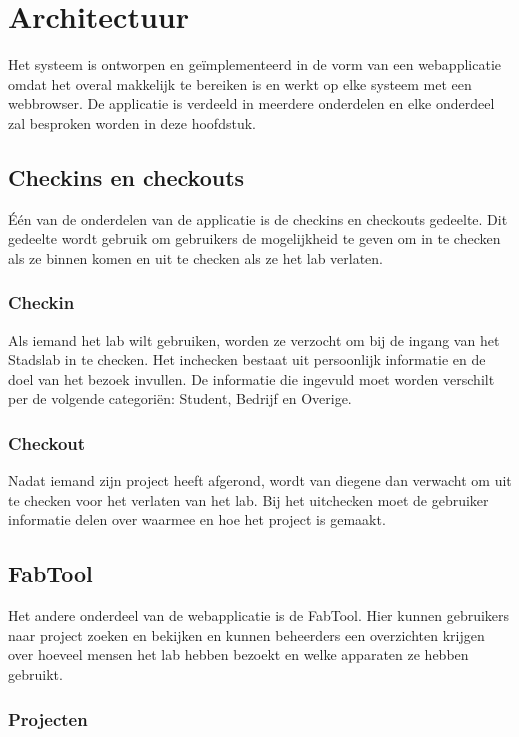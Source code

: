 \chapter{Architectuur}

Het systeem is ontworpen en ge\"implementeerd in de vorm van een webapplicatie omdat het overal makkelijk te bereiken is en werkt op elke systeem met een webbrowser. De applicatie is verdeeld in meerdere onderdelen en elke onderdeel zal besproken worden in deze hoofdstuk.

\section{Checkins en checkouts}

\'E\'en van de onderdelen van de applicatie is de checkins en checkouts gedeelte. Dit gedeelte wordt gebruik om gebruikers de mogelijkheid te geven om in te checken als ze binnen komen en uit te checken als ze het lab verlaten.

\subsection{Checkin}

Als iemand het lab wilt gebruiken, worden ze verzocht om bij de ingang van het Stadslab in te checken. Het inchecken bestaat uit persoonlijk informatie en de doel van het bezoek invullen. De informatie die ingevuld moet worden verschilt per de volgende categori\"en: Student, Bedrijf en Overige.

\subsection{Checkout}

Nadat iemand zijn project heeft afgerond, wordt van diegene dan verwacht om uit te checken voor het verlaten van het lab. Bij het uitchecken moet de gebruiker informatie delen over waarmee en hoe het project is gemaakt.

\section{FabTool}

Het andere onderdeel van de webapplicatie is de FabTool. Hier kunnen gebruikers naar project zoeken en bekijken en kunnen beheerders een overzichten krijgen over hoeveel mensen het lab hebben bezoekt en welke apparaten ze hebben gebruikt.

\subsection{Projecten}

